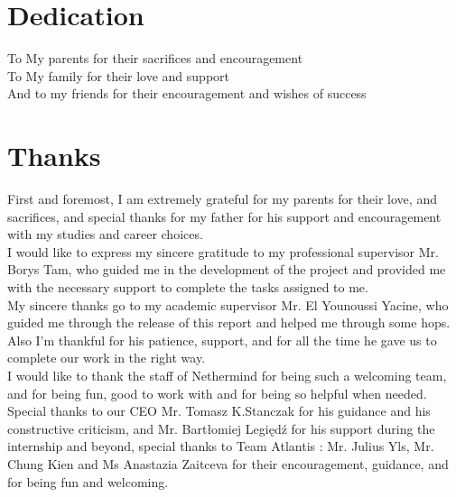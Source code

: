 
\chapter*{Dedication}
%
\begin{center}

  To My parents for their sacrifices and encouragement ~\\
  To  My family for their love and support ~\\
  And to my friends for their encouragement and wishes of success ~\\
\end{center}
%
%
%
%
%
%
%
\cleardoublepage%

\chapter*{Thanks}
%
First and foremost, I am extremely grateful for my parents for their love,
and sacrifices, and special thanks for my father for his support and encouragement with my studies and career choices.\\
I would like to express my sincere gratitude to my professional supervisor Mr. Borys Tam, who guided me in the development of the project
and provided me with the necessary support to complete the tasks assigned to me. \\
My sincere thanks go to my academic supervisor Mr. El Younoussi Yacine, who
guided me through the release of this report and helped me through some hops. Also I’m thankful for his patience, support,  and for all
the time he gave us to complete our work in the right way.\\
I would like to thank the staff of Nethermind for being such a welcoming team, and for being 
fun, good to work with and for being so helpful when needed. Special thanks to our CEO Mr. Tomasz K.Stanczak for his guidance and his constructive criticism,
and Mr. Bartłomiej Legiędź for his support during the internship and beyond, special thanks to Team Atlantis : Mr. Julius Yls, Mr. Chung Kien and Ms Anastazia Zaitceva for their 
encouragement, guidance, and for being fun and welcoming.

